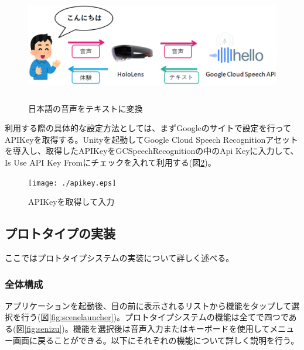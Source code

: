 \documentclass[11pt,a4j, titlepage]{jarticle} %
\begin{document}
\begin{figure}[H]
  \begin{center}
    \includegraphics[clip,height=5.0cm,width=14.0cm]{./googlespeech.eps}
    \caption{日本語の音声をテキストに変換}
    \label{fig:googlespeech}
  \end{center}
\end{figure}

利用する際の具体的な設定方法としては、まずGoogleのサイトで設定を行ってAPIKeyを取得する\cite{googlesetting}。Unityを起動してGoogle Cloud Speech Recognitionアセット\cite{speechrecognition}を導入し、取得したAPIKeyをGCSpeechRecognitionの中のApi Keyに入力して、Is Use API Key Fromにチェックを入れて利用する(図\ref{fig:apikey})。

\begin{figure}[H]
  \begin{center}
    \texttt{[image: ./apikey.eps]}
    \caption{APIKeyを取得して入力}
    \label{fig:apikey}
  \end{center}
\end{figure}

\subsection{プロトタイプの実装}
ここではプロトタイプシステムの実装について詳しく述べる。

\subsubsection{全体構成}
アプリケーションを起動後、目の前に表示されるリストから機能をタップして選択を行う(図\ref{fig:scenelauncher})。プロトタイプシステムの機能は全てで四つである(図\ref{fig:senizu})。機能を選択後は音声入力またはキーボードを使用してメニュー画面に戻ることができる。以下にそれぞれの機能について詳しく説明を行う。
\end{document}

